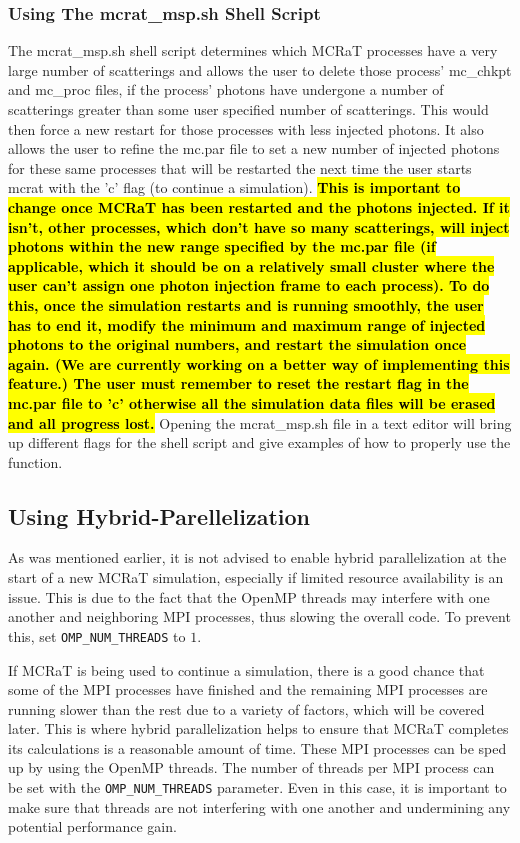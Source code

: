 \documentclass[12pt,a4paper]{article}
\begin{document}
 \subsubsection{Using The mcrat\_msp.sh Shell Script}
 The mcrat\_msp.sh shell script determines which MCRaT processes have a very large number of scatterings and allows the user to delete those process' mc\_chkpt and mc\_proc files, if the process' photons have undergone a number of scatterings greater than some user specified number of scatterings. This would then force a new restart for those processes with less injected photons. It also allows the user to refine the mc.par file to set a new number of injected photons for these same processes that will be restarted the next time the user starts mcrat with the 'c' flag (to continue a simulation). \hl{\bf This is important to change once MCRaT has been restarted and the photons injected. If it isn't, other processes, which don't have so many scatterings, will inject photons within the new range specified by the mc.par file (if applicable, which it should be on a relatively small cluster where the user can't assign one photon injection frame to each process). To do this, once the simulation restarts and is running smoothly, the user has to end it, modify the minimum and maximum range of injected photons to the original numbers, and restart the simulation once again. (We are currently working on a better way of implementing this feature.) The user must remember to reset the restart flag in the mc.par file to 'c' otherwise all the simulation data files will be erased and all progress lost.} Opening the mcrat\_msp.sh file in a text editor will bring up different flags for the shell script and give examples of how to properly use the function.
 
 \subsection{Using Hybrid-Parellelization}
 As was mentioned earlier, it is not advised to enable hybrid parallelization at the start of a new MCRaT simulation, especially if limited resource availability is an issue. This is due to the fact that the OpenMP threads may interfere with one another and neighboring MPI processes, thus slowing the overall code. To prevent this, set \texttt{OMP\_NUM\_THREADS} to $1$.
 
 If MCRaT is being used to continue a simulation, there is a good chance that some of the MPI processes have finished and the remaining MPI processes are running slower than the rest due to a variety of factors, which will be covered later. This is where hybrid parallelization helps to ensure that MCRaT completes its calculations is a reasonable amount of time. These MPI processes can be sped up by using the OpenMP threads. The number of threads per MPI process can be set with the \texttt{OMP\_NUM\_THREADS} parameter. Even in this case, it is important to make sure that threads are not interfering with one another and undermining any potential performance gain.
 
\end{document}
